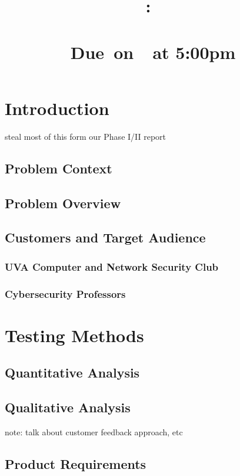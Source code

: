 \documentclass[openright]{report}
\title{
    \vspace{2in}
    \LARGE{\textbf{\projectTitle}}\\
    \vspace{0.1in}\large{\reportClass:\ \reportTopic}\\
    \vspace{0.1in}\large{\reportClassInstructor}\\
    \normalsize\vspace{0.1in}\large{Due\ on\ \reportDueDate\ at 5:00pm}
    \vspace{1.4in}
}
\author{\reportAuthorName}
\date{}
\begin{document}
\maketitle

\large{\tableofcontents}

\chapter{Introduction}

\par steal most of this form our Phase I/II report

\section{Problem Context}

\section{Problem Overview}

\section{Customers and Target Audience}

\subsection{UVA Computer and Network Security Club}

\subsection{Cybersecurity Professors}


\chapter{Testing Methods}

\section{Quantitative Analysis}

\section{Qualitative Analysis}
note: talk about customer feedback approach, etc

\section{Product Requirements}
\end{document}
